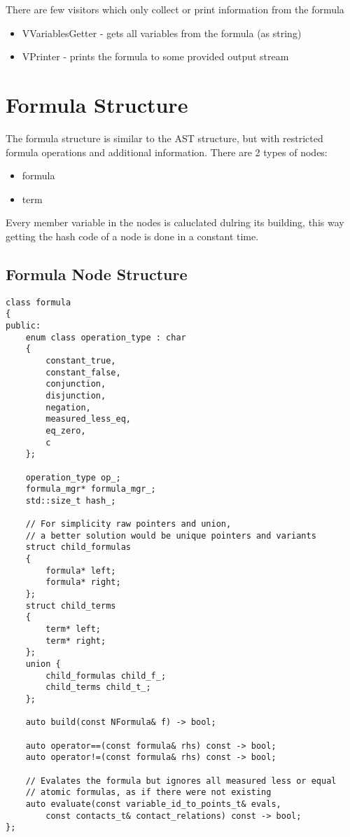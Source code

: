 \documentclass{article}
\begin{document}
				There are few visitors which only collect or print information from the formula
					\begin{itemize}
						\item VVariablesGetter - gets all variables from the formula (as string)
						\item VPrinter - prints the formula to some provided output stream
					\end{itemize}
	
	\newpage
	\section{Formula Structure}
		The formula structure is similar to the AST structure, but with restricted formula operations and additional information.
		There are 2 types of nodes: 
			\begin{itemize}
				\item formula
				\item term
			\end{itemize}
		Every member variable in the nodes is caluclated dulring its building,
		this way getting the hash code of a node is done in a constant time.

		\subsection*{Formula Node Structure}
		\begin{lstlisting}
class formula
{
public:
    enum class operation_type : char
    {
        constant_true,
        constant_false,
        conjunction,
        disjunction,
        negation,
        measured_less_eq,
        eq_zero,
        c
    };

    operation_type op_;
    formula_mgr* formula_mgr_;
    std::size_t hash_;

    // For simplicity raw pointers and union, 
    // a better solution would be unique pointers and variants
    struct child_formulas
    {
        formula* left;
        formula* right;
    };
    struct child_terms
    {
        term* left;
        term* right;
    };
    union {
        child_formulas child_f_;
        child_terms child_t_;
    };

    auto build(const NFormula& f) -> bool;

    auto operator==(const formula& rhs) const -> bool;
    auto operator!=(const formula& rhs) const -> bool;

    // Evalates the formula but ignores all measured less or equal 
    // atomic formulas, as if there were not existing
    auto evaluate(const variable_id_to_points_t& evals,
		const contacts_t& contact_relations) const -> bool;
};
		\end{lstlisting}
	
\end{document}
